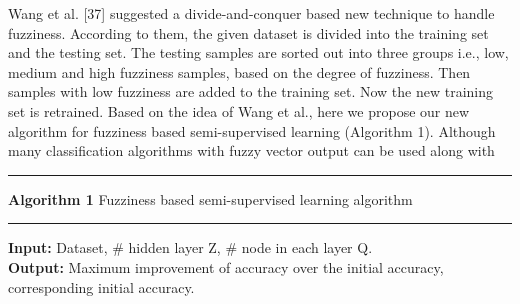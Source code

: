 \documentclass{article}
\begin{document}
		Wang et al. [37] \cite{abd2001multi} suggested a divide-and-conquer based new technique to handle fuzziness. According to them, the given dataset is divided into the training set and the testing set. The testing samples are sorted out into three groups i.e., low, medium and high fuzziness samples, based on the degree of fuzziness. Then samples with low fuzziness are added to the training set. Now the new training set is retrained. Based on the idea of Wang et al., here we propose our new algorithm for fuzziness based semi-supervised learning (Algorithm 1). Although many classification algorithms with fuzzy vector output can be used along with\\
		\hrule 
		\vspace{0.3em}\textbf{Algorithm 1} Fuzziness based semi-supervised learning algorithm \vspace{0.5em}
		\hrule \vspace{0.5em}
		\textbf{Input:} Dataset, \# hidden layer Z, \# node in each layer Q.\\
		\textbf{Output:} Maximum improvement of accuracy over the initial accuracy, corresponding initial accuracy.
\end{document}
